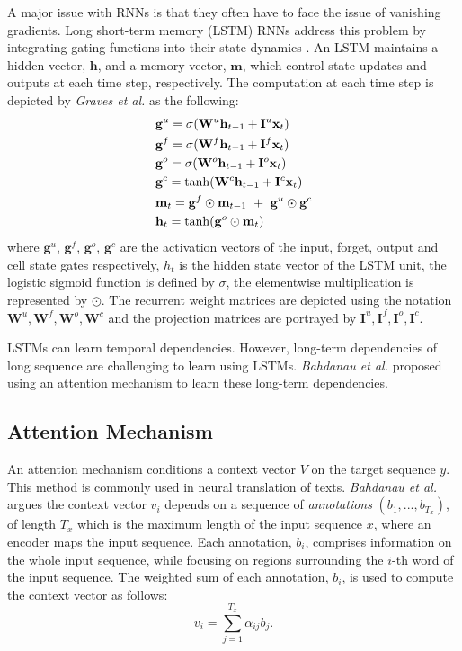 \documentclass[preprint,12pt,3p]{elsarticle}
\begin{document}
A major issue with RNNs is that they often have to face the issue of vanishing gradients. Long short-term memory (LSTM) RNNs address this problem by integrating gating functions into their state dynamics \cite{hochreiter1997long}. An LSTM maintains a hidden vector, $\mathbf h$, and a memory vector, $\mathbf m$, which control state updates and outputs at each time step, respectively.  The computation at each time step is depicted by \textit{Graves et al.} \cite{graves2012supervised} as the following:
\begin{equation}
	\begin{split}
		& \mathbf g^u = \sigma(\mathbf W^u\mathbf h_{t-1}  + \mathbf I^u{\mathbf x}_t ) \\
		& \mathbf g^f = \sigma(\mathbf W^f\mathbf h_{t-1} + \mathbf I^f{\mathbf x}_t) \\
		& \mathbf g^o = \sigma(\mathbf W^o\mathbf h_{t-1} + \mathbf I^o{\mathbf x}_t) \\
		& \mathbf g^c = \tanh(\mathbf W^c\mathbf h_{t-1} + \mathbf I^c{\mathbf x}_t) \\
		& \mathbf m_t = \mathbf g^f \odot \mathbf m_{t-1}\mathbf \ + \  \mathbf g^u \odot 
		\mathbf g^c \\
		& \mathbf h_t = \tanh(\mathbf g^o \odot \mathbf m_t) 
	\end{split}
\end{equation}
where \textbf{$\mathbf g^u$}, \textbf{$\mathbf g^f$}, \textbf{$\mathbf g^o$}, \textbf{$\mathbf g^c$} are the activation vectors of the input, forget, output and cell state gates respectively, $h_t$ is the hidden state vector of the LSTM unit, the logistic sigmoid function is defined by $\sigma$, the elementwise multiplication is represented by $\odot$. The recurrent weight matrices are depicted using the notation $\mathbf W^u, \mathbf W^f, \mathbf W^o, \mathbf W^c$ and the projection matrices are portrayed by $\mathbf I^u, \mathbf I^f, \mathbf I^o, \mathbf I^c$.

LSTMs can learn temporal dependencies. However, long-term dependencies of long sequence are challenging to learn using LSTMs. \textit{Bahdanau et al.} \cite{bahdanau2014neural} proposed using an attention mechanism to learn these long-term dependencies. 

\subsection{Attention Mechanism}
An attention mechanism conditions a context vector $V$ on the target sequence $y$. This method is commonly used in neural translation of texts. \textit{Bahdanau et al.}\cite{bahdanau2014neural} argues the context vector $v_i$ depends on a sequence of \textit{annotations} $(b_1, ..., b_{T_{x}})$, of length $T_x$ which is the maximum length of the input sequence $x$, where an encoder maps the input sequence. Each annotation, $b_i$, comprises information on the whole input sequence, while focusing on regions surrounding the $i$-th word of the input sequence. The weighted sum of each annotation, $b_i$, is used to compute the context vector as follows:
\begin{equation}
    v_i = \sum_{j=1}^{T_x} \alpha_{ij}b_j.
\end{equation}
\end{document}

